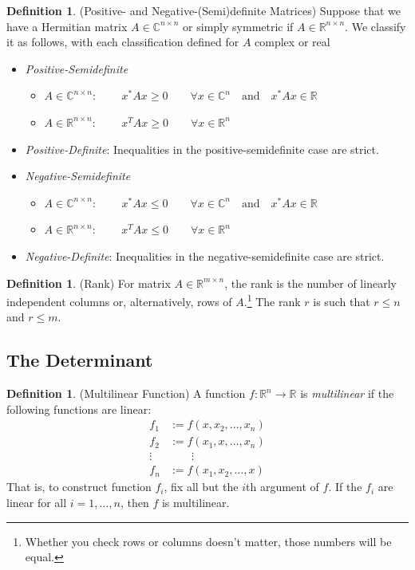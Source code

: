 \documentclass[12pt]{article}
\numberwithin{equation}{section} %
\theoremstyle{plain}
\theoremstyle{definition}
\newtheorem{defn}[thm]{Definition}
\theoremstyle{remark}
\newcommand{\R}{\mathbb{R}}
\newcommand{\C}{\mathbb{C}}
\begin{document}
\begin{defn}{(Positive- and Negative-(Semi)definite Matrices)}
Suppose that we have a Hermitian matrix $A \in \C^{n\times n}$ or simply
symmetric if $A \in \R^{n\times n}$. We classify it as follows, with
each classification defined for $A$ complex or real
\begin{itemize}
  \item \emph{Positive-Semidefinite}
    \begin{itemize}
      \item $A \in \C^{n\times n}$:
          $\qquad x^* A x \geq 0
          \qquad \forall x\in \C^n
          \quad \text{and} \quad x^* A x\in \R$
      \item $A \in \R^{n\times n}$:
          $\qquad x^T A x\geq 0
          \qquad \forall x\in \R^n$
    \end{itemize}
  \item \emph{Positive-Definite}: Inequalities in the
    positive-semidefinite case are strict.
  \item \emph{Negative-Semidefinite}
    \begin{itemize}
      \item $A \in \C^{n\times n}$:
          $\qquad x^* A x \leq 0
          \qquad \forall x\in \C^n
          \quad \text{and} \quad x^* A x\in \R$
      \item $A \in \R^{n\times n}$:
          $\qquad x^T A x\leq 0
          \qquad \forall x\in \R^n$
    \end{itemize}
  \item \emph{Negative-Definite}: Inequalities in the
    negative-semidefinite case are strict.
\end{itemize}
\end{defn}

\begin{defn}{(Rank)}
For matrix $A\in \R^{m \times n}$, the rank is the number of linearly
independent columns or, alternatively, rows of $A$.\footnote{Whether you
check rows or columns doesn't matter, those numbers will be equal.} The
rank $r$ is such that $r \leq n$ and $r\leq m$.
\end{defn}

\subsection{The Determinant}

\begin{defn}{(Multilinear Function)}
A function $f:\R^n\rightarrow \R$ is \emph{multilinear} if the following
functions are linear:
\begin{align*}
  f_1 &:= f(x,x_2,\ldots,x_n)\\
  f_2 &:= f(x_1,x,\ldots,x_n)\\
  \vdots\; & \qquad \vdots\\
  f_n &:= f(x_1,x_2,\ldots,x)
\end{align*}
That is, to construct function $f_i$, fix all but the $i$th argument of
$f$. If the $f_i$ are linear for all $i = 1,\ldots, n$, then $f$ is
multilinear.
\end{defn}
\end{document}
